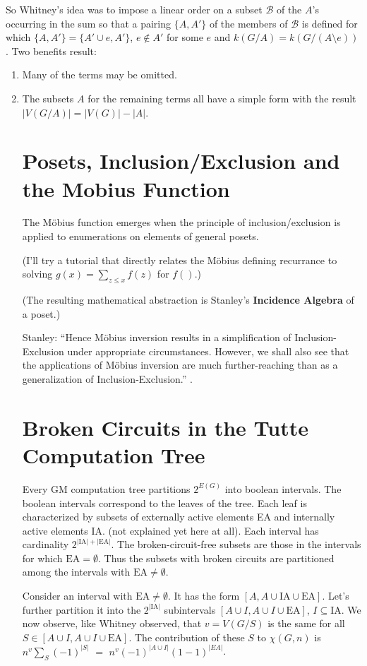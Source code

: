 \documentclass{article}
\begin{document}
So Whitney's idea was to impose a linear order on a subset $\mathcal{B}$
of the $A$'s occurring 
in the sum so that a pairing $\{A,A'\}$ of the members of $\mathcal{B}$ 
is defined for which $\{A,A'\}=\{A'\cup e, A'\}$, $e\not\in A'$ for some $e$
and $k(G/A) = k(G/(A\setminus e))$.  Two benefits result:
\begin{enumerate}
\item Many of the terms may be omitted.
\item The subsets $A$ for the remaining terms all have a simple form with the 
result $|V(G/A)| = |V(G)| - |A| $.

\section{Posets, Inclusion/Exclusion and the Mobius Function}

The M\"{o}bius function emerges when the principle of inclusion/exclusion is
applied to enumerations on elements of general posets.

(I'll try a tutorial that directly relates the M\"{o}bius defining recurrance to
solving $g(x) = \sum_{z\le x}f(z)$ for $f()$.)

(The resulting mathematical abstraction is Stanley's 
\textbf{Incidence Algebra} of a poset\cite{StanleyEC1}.)

Stanley: ``Hence M\"{o}bius inversion results in a simplification
of Inclusion-Exclusion under appropriate circumstances. However, we shall also see that
the applications of M\"{o}bius inversion are much 
further-reaching than as a generalization of
Inclusion-Exclusion.'' \cite[ch.~3]{StanleyEC1}.


\section{Broken Circuits in the Tutte Computation Tree}

Every GM computation tree partitions $2^{E(G)}$ into 
boolean intervals\cite{GordonMcMachonGreedoid}.  The boolean
intervals correspond to the leaves of the tree.  Each leaf is
characterized by subsets of externally active elements
EA and internally active elements IA.
(not explained yet here at all).
Each interval has cardinality $2^{|\text{IA}|+|\text{EA}|}$.
The broken-circuit-free subsets are those in the intervals for which
$\text{EA}=\emptyset$.  Thus the subsets with broken circuits are partitioned
among the intervals with $\text{EA}\neq\emptyset$.  

Consider an interval with $\text{EA}\neq\emptyset$. It has the
form $[A, A\cup\text{IA}\cup\text{EA}]$.  Let's further partition
it into the $2^{|\text{IA}|}$ subintervals $[A\cup I, A\cup I\cup \text{EA}]$, 
$I\subseteq\text{IA}$.    
We now observe, like Whitney observed, that
$v=V(G/S)$ is the same for all $S\in[A\cup I, A\cup I\cup \text{EA}]$.  The
contribution of these $S$ to $\chi(G,n)$ is $n^v\sum_S(-1)^{|S|}$ $=$
$n^v(-1)^{|A\cup I|}(1-1)^{|EA|}$.


\end{enumerate}
\end{document}
